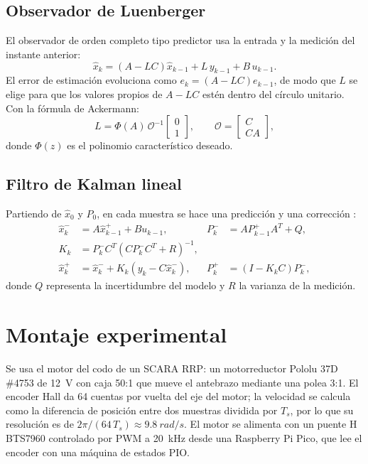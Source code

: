 \documentclass[conference,a4paper]{IEEEtran}
\begin{document}
\subsection{Observador de Luenberger}
El observador de orden completo tipo predictor usa la entrada y la medición del instante anterior:
\begin{equation}
\hat{x}_k = (A-LC)\hat{x}_{k-1} + L\,y_{k-1} + B\,u_{k-1}.
\label{eq:luen}
\end{equation}
El error de estimación evoluciona como $e_k=(A-LC)e_{k-1}$, de modo que $L$ se elige para que los valores propios de $A-LC$ estén dentro del círculo unitario. Con la fórmula de Ackermann:
\begin{equation}
L = \Phi(A)\,\mathcal{O}^{-1}\begin{bmatrix}0\\1\end{bmatrix},\qquad \mathcal{O}=\begin{bmatrix}C\\CA\end{bmatrix},
\end{equation}
donde $\Phi(z)$ es el polinomio característico deseado.

\subsection{Filtro de Kalman lineal}
Partiendo de $\hat{x}_0$ y $P_0$, en cada muestra se hace una predicción y una corrección \cite{welch}:
\begin{align}
\hat{x}_k^- &= A\hat{x}_{k-1}^+ + B u_{k-1}, & P_k^- &= A P_{k-1}^+ A^T + Q,\\
K_k &= P_k^- C^T (C P_k^- C^T + R)^{-1}, & &\\
\hat{x}_k^+ &= \hat{x}_k^- + K_k(y_k - C\hat{x}_k^-), & P_k^+ &= (I-K_kC)P_k^- ,
\end{align}
donde $Q$ representa la incertidumbre del modelo y $R$ la varianza de la medición.

\section{Montaje experimental}
Se usa el motor del codo de un SCARA RRP: un motorreductor Pololu 37D \#4753 de \SI{12}{V} con caja 50:1 \cite{pololu} que mueve el antebrazo mediante una polea 3:1. El encoder Hall da 64 cuentas por vuelta del eje del motor; la velocidad se calcula como la diferencia de posición entre dos muestras dividida por $T_s$, por lo que su resolución es de $2\pi/(64\,T_s)\approx\SI{9.8}{rad/s}$. El motor se alimenta con un puente H BTS7960 controlado por PWM a \SI{20}{kHz} desde una Raspberry Pi Pico, que lee el encoder con una máquina de estados PIO.
\end{document}
